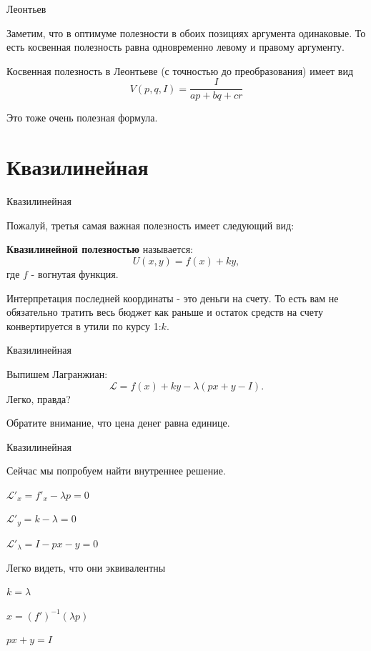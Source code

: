 \documentclass{beamer}
\begin{document}
\begin{frame}{Леонтьев}

Заметим, что в оптимуме полезности в обоих позициях аргумента одинаковые. То есть косвенная полезность равна одновременно левому и правому аргументу.


Косвенная полезность в Леонтьеве (с точностью до преобразования) имеет вид
$$V(p,q,I) = \frac{I}{ap + bq + cr}$$

Это тоже очень полезная формула.

\end{frame}

\section{Квазилинейная}

\begin{frame}{Квазилинейная}

Пожалуй, третья самая важная полезность имеет следующий вид:

\begin{definition}
\textbf{Квазилинейной полезностью} называется:
$$U(x, y) = f(x) + k y,$$ 
где $f$ - вогнутая функция.
\end{definition}

Интерпретация последней координаты - это деньги на счету. То есть вам не обязательно тратить весь бюджет как раньше и остаток средств на счету конвертируется в утили по курсу 1:$k$.

\end{frame}

\begin{frame}{Квазилинейная}

Выпишем Лагранжиан:
$$\mathcal{L} = f(x) + k y - \lambda (px + y - I).$$ 
Легко, правда?

Обратите внимание, что цена денег равна единице.

\end{frame}

\begin{frame}{Квазилинейная}

Сейчас мы попробуем найти внутреннее решение.

$\mathcal{L}'_x = f'_x - \lambda p = 0$

$\mathcal{L}'_y = k - \lambda = 0$

$\mathcal{L}'_{\lambda} = I - p x - y= 0$

Легко видеть, что они эквивалентны

$k = \lambda$

$x = (f')^{-1}(\lambda p)$

$px + y = I$

\end{frame}
\end{document}
